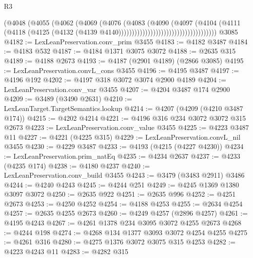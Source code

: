 \begin{lexlean}{R3}
\begin{coremodule}
                                                  (@4048
                                                    (@4055
                                                      (@4062
                                                        (@4069
                                                          (@4076
                                                            (@4083
                                                              (@4090
                                                                (@4097
                                                                  (@4104
                                                                    (@4111
                                                                      (@4118
                                                                        (@4125
                                                                          (@4132
                                                                            (@4139
                                                                              @4140)))))))))))))))))))))))))))))))))))))
    @3085
@4182 := LexLeanPreservation.conv_prim @3455
@4183 := @4182 @3487
@4184 := @4183 @532
@4187 := @4184 @1371 @3075 @3072
@4188 := @2635 @315
@4189 := @4188 @2673
@4193 := @4187 (@2901 @4189) (@2866 @3085)
@4195 := LexLeanPreservation.convL_cons @3455
@4196 := @4195 @3487
@4197 := @4196 @192
@4202 := @4197 @318 @3072 @3074 @2900 @4189
@4204 := LexLeanPreservation.conv_var @3455
@4207 := @4204 @3487 @174 @2900
@4209 := @3489 (@3490 @2631)
@4210 := LexLeanTarget.TargetSemantics.lookup
@4214 := @4207 (@4209 (@4210 @3487 @174))
@4215 := @4202 @4214
@4221 := @4196 @316 @234 @3072 @3072 @315 @2673
@4223 := LexLeanPreservation.conv_value @3455
@4225 := @4223 @3487 @11
@4227 := @4221 (@4225 @315)
@4229 := LexLeanPreservation.convL_nil @3455
@4230 := @4229 @3487
@4233 := @4193 (@4215 (@4227 @4230))
@4234 := LexLeanPreservation.prim_natEq
@4235 := @4234 @2637
@4237 := @4233 (@4235 @174)
@4238 := @4180 @4237
@4240 := LexLeanPreservation.conv_build @3455
@4243 := @3479 (@3483 @2911) @3486
@4244 := @4240 @4243
@4245 := @4244 @251
@4249 := @4245 @1369 @1380 @3097 @3072
@4250 := @2635 @922
@4251 := @2635 @996
@4252 := @4251 @2673
@4253 := @4250 @4252
@4254 := @4188 @4253
@4255 := @2634 @4254
@4257 := @2635 @4255 @2673
@4260 := @4249 @4257 (@2896 @4257)
@4261 := @4195 @4243
@4267 := @4261 @1378 @234 @3095 @3072 @4255 @2673
@4268 := @4244 @198
@4274 := @4268 @134 @1377 @3093 @3072 @4254 @4255
@4275 := @4261 @316
@4280 := @4275 @1376 @3072 @3075 @315 @4253
@4282 := @4223 @4243 @11
@4283 := @4282 @315

\end{coremodule}
\end{lexlean}
